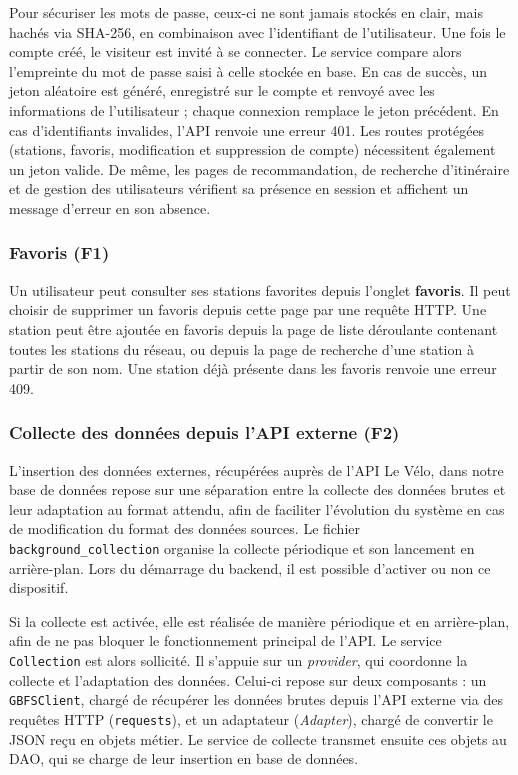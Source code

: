 \documentclass[
  french,
  11pt,
  a4paper,
]{article}
\begin{document}
Pour sécuriser les mots de passe, ceux-ci ne sont jamais stockés en
clair, mais hachés via SHA-256, en combinaison avec l'identifiant de
l'utilisateur. Une fois le compte créé, le visiteur est invité à se
connecter. Le service compare alors l'empreinte du mot de passe saisi à
celle stockée en base. En cas de succès, un jeton aléatoire est généré,
enregistré sur le compte et renvoyé avec les informations de
l'utilisateur ; chaque connexion remplace le jeton précédent. En cas
d'identifiants invalides, l'API renvoie une erreur 401. Les routes
protégées (stations, favoris, modification et suppression de compte)
nécessitent également un jeton valide. De même, les pages de
recommandation, de recherche d'itinéraire et de gestion des utilisateurs
vérifient sa présence en session et affichent un message d'erreur en son
absence.

\subsubsection{Favoris (F1)}\label{favoris-f1}

Un utilisateur peut consulter ses stations favorites depuis l'onglet
\textbf{favoris}. Il peut choisir de supprimer un favoris depuis cette
page par une requête HTTP. Une station peut être ajoutée en favoris
depuis la page de liste déroulante contenant toutes les stations du
réseau, ou depuis la page de recherche d'une station à partir de son
nom. Une station déjà présente dans les favoris renvoie une erreur 409.

\subsubsection{Collecte des données depuis l'API externe
(F2)}\label{collecte-des-donnuxe9es-depuis-lapi-externe-f2}

L'insertion des données externes, récupérées auprès de l'API Le Vélo,
dans notre base de données repose sur une séparation entre la collecte
des données brutes et leur adaptation au format attendu, afin de
faciliter l'évolution du système en cas de modification du format des
données sources. Le fichier \texttt{background\_collection} organise la
collecte périodique et son lancement en arrière-plan. Lors du démarrage
du backend, il est possible d'activer ou non ce dispositif.

Si la collecte est activée, elle est réalisée de manière périodique et
en arrière-plan, afin de ne pas bloquer le fonctionnement principal de
l'API. Le service \texttt{Collection} est alors sollicité. Il s'appuie
sur un \emph{provider}, qui coordonne la collecte et l'adaptation des
données. Celui-ci repose sur deux composants : un \texttt{GBFSClient},
chargé de récupérer les données brutes depuis l'API externe via des
requêtes HTTP (\texttt{requests}), et un adaptateur (\emph{Adapter}),
chargé de convertir le JSON reçu en objets métier. Le service de
collecte transmet ensuite ces objets au DAO, qui se charge de leur
insertion en base de données.
\end{document}
